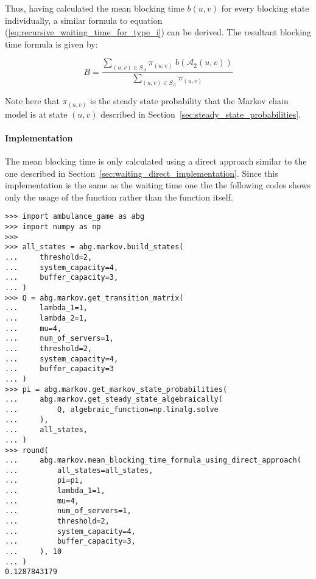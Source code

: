 Thus, having calculated the mean blocking time \(b(u,v)\) for every blocking
state individually, a similar formula to equation
(\ref{eq:recursive_waiting_time_for_type_i}) can be derived.
The resultant blocking time formula is given by:

\begin{equation}\label{eq:blocking_time_formula}
    B = \frac{\sum_{(u,v) \in S_A} \pi_{(u,v)} \; b(\mathcal{A}_2(u,v))}{
        \sum_{(u,v) \in S_A}\pi_{(u,v)}}
\end{equation}

Note here that \(\pi_(u,v)\) is the steady state probability that the Markov
chain model is at state \((u,v)\) described in
Section~\ref{sec:steady_state_probabilities}.

\paragraph{Implementation}\label{sec:implementation_blocking_time}

The mean blocking time is only calculated using a direct approach
similar to the one described in Section~\ref{sec:waiting_direct_implementation}.
Since this implementation is the same as the waiting time one the the following
codes shows only the usage of the function rather than the function itself.

\begin{lstlisting}[style=pystyle]
>>> import ambulance_game as abg
>>> import numpy as np
>>>
>>> all_states = abg.markov.build_states(
...     threshold=2,
...     system_capacity=4,
...     buffer_capacity=3,
... )
>>> Q = abg.markov.get_transition_matrix(
...     lambda_1=1,
...     lambda_2=1,
...     mu=4,
...     num_of_servers=1,
...     threshold=2,
...     system_capacity=4,
...     buffer_capacity=3
... )
>>> pi = abg.markov.get_markov_state_probabilities(
...     abg.markov.get_steady_state_algebraically(
...         Q, algebraic_function=np.linalg.solve
...     ),
...     all_states,
... )
>>> round(
...     abg.markov.mean_blocking_time_formula_using_direct_approach(
...         all_states=all_states,
...         pi=pi,
...         lambda_1=1,
...         mu=4,
...         num_of_servers=1,
...         threshold=2,
...         system_capacity=4,
...         buffer_capacity=3,
...     ), 10
... )
0.1287843179

\end{lstlisting}

